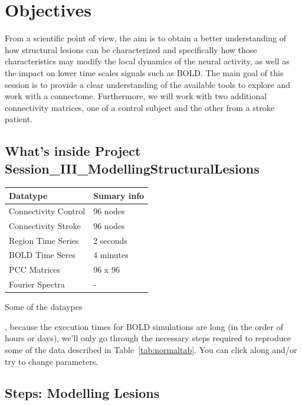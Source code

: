 \documentclass{tufte-handout}
\begin{document}
\section{Objectives}\label{sec:objectives}

From a scientific point of view, the aim is to obtain a better understanding of
how structural lesions can be characterized and specifically how those
characteristics may modify the local dynamics of the neural activity, as well
as the impact on lower time scales signals such as BOLD. The main goal of this
session is to provide a clear understanding of the available tools to explore
and work with a connectome. Furthermore, we will work with two additional
connectivity matrices, one of a control subject and the other from a stroke
patient.


\subsection{What's inside Project Session\_III\_ModellingStructuralLesions}\label{sec:project_data}

\begin{margintable}
  \centering
  \selectfont
  \begin{tabular}{ll}
    \toprule
    Datatype & Sumary info                       \\
    \midrule
    Connectivity Control & 96 {nodes}            \\
    Connectivity Stroke  & 96 {nodes}            \\
    Region Time Series   & 2 seconds             \\
    BOLD   Time Seres    & 4 minutes             \\  
    PCC Matrices         & 96 x 96               \\
    Fourier Spectra      &  - \\ 
    \bottomrule
  \end{tabular}
  \caption{Some of the dataypes}
  \label{tab:normaltab}
\end{margintable}


, because the execution times for BOLD simulations
are long (in the order of hours or days), we'll only go through the necessary
steps required to reproduce some of the data described in
Table~\ref{tab:normaltab}. You can click along and/or try to change
parameters.


\subsection{Steps: Modelling Lesions}\label{sec:steps}
\end{document}

